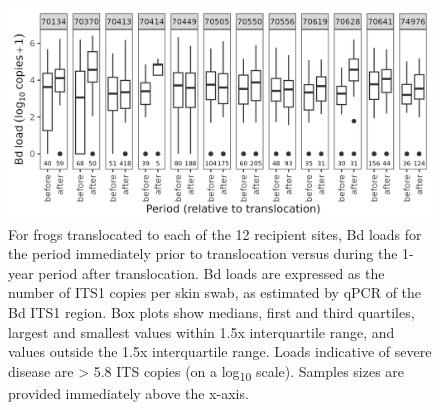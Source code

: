 \documentclass[
  letterpaper,
  DIV=11,
  numbers=noendperiod]{scrartcl}
\begin{document}
\begin{figure}

{\centering \includegraphics[width=6.5625in,height=\textheight]{figures/bdload_beforeafter.png}

}

\caption{\label{fig-bdload-beforeafter}For frogs translocated to each of
the 12 recipient sites, Bd loads for the period immediately prior to
translocation versus during the 1-year period after translocation. Bd
loads are expressed as the number of ITS1 copies per skin swab, as
estimated by qPCR of the Bd ITS1 region. Box plots show medians, first
and third quartiles, largest and smallest values within 1.5x
interquartile range, and values outside the 1.5x interquartile range.
Loads indicative of severe disease are \textgreater{} 5.8 ITS copies (on
a log\textsubscript{10} scale). Samples sizes are provided immediately
above the x-axis.}

\end{figure}

\newpage
\end{document}
